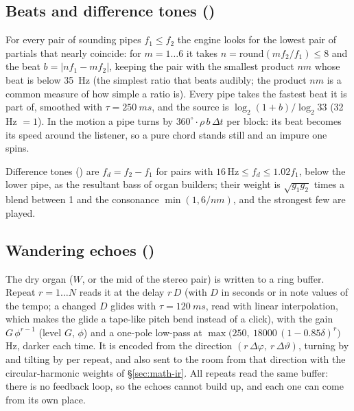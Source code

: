 \subsection{Beats and difference tones ()}
\label{sec:math-beats}
For every pair of sounding pipes $f_1\le f_2$ the engine looks for the lowest pair of partials that nearly coincide:
for $m = 1\dots6$ it takes $n = \mathrm{round}(mf_2/f_1)\le8$ and the beat $b = |nf_1 - mf_2|$, keeping the pair with the
smallest product $nm$ whose beat is below \SI{35}{Hz} (the simplest ratio that beats audibly; the product $nm$ is a
common measure of how simple a ratio is). Every pipe takes the fastest beat it is part of, smoothed with
$\tau = \SI{250}{ms}$, and the source  is $\log_2(1+b)/\log_2 33$ (32\,Hz $=1$). In the motion
 a pipe turns by $360^\circ\cdot\rho\,b\,\Delta t$ per block: its beat becomes its speed around the
listener, so a pure chord stands still and an impure one spins.

Difference tones () are $f_d = f_2 - f_1$ for pairs with $16\,\mathrm{Hz}\le f_d\le 1.02f_1$, below the lower
pipe, as the resultant bass of organ builders; their weight is $\sqrt{g_1g_2}$ times a blend between 1 and the
consonance $\min(1, 6/nm)$, and the strongest few are played.

\subsection{Wandering echoes ()}
\label{sec:math-echoes}
The dry organ ($W$, or the mid of the stereo pair) is written to a ring buffer. Repeat $r = 1\dots N$ reads it at the
delay $r\,D$ (with $D$ in seconds or in note values of the tempo; a changed $D$ glides with $\tau = \SI{120}{ms}$, read with
linear interpolation, which makes the glide a tape-like pitch bend instead of a click), with the gain
$G\,\phi^{r-1}$ (level $G$,  $\phi$) and a one-pole low-pass at
$\max\bigl(250,\ 18000\,(1-0.85\delta)^r\bigr)$\,Hz, darker each time. It is encoded from the direction
$(r\,\Delta\varphi,\ r\,\Delta\vartheta)$, turning by  and tilting by  per repeat, and also sent to
the room from that direction with the circular-harmonic weights of \S\ref{sec:math-ir}. All repeats read the same
buffer: there is no feedback loop, so the echoes cannot build up, and each one can come from its own place.
